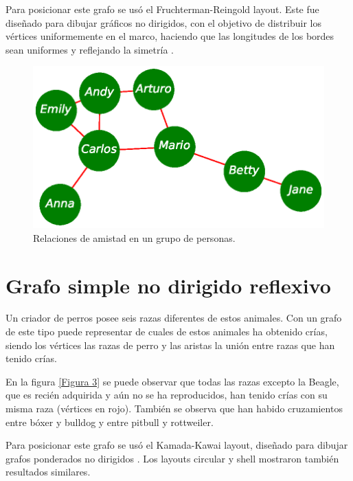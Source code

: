 \documentclass{article}
\begin{document}
Para posicionar este grafo se usó el Fruchterman-Reingold layout. Este fue diseñado para dibujar gráficos no dirigidos, con el objetivo de distribuir los vértices uniformemente en el marco, haciendo que las longitudes de los bordes sean uniformes y reflejando la simetría \cite{fruchterman1991graph}.
 
\begin{figure}
 \begin{center}
  \includegraphics[width=.6\columnwidth]{fig2.eps}
   \end{center}
  \caption{Relaciones de amistad en un grupo de personas.}
  \label{Figura 2}
\end{figure}



\section{Grafo simple no dirigido reflexivo}

Un criador de perros posee seis razas diferentes de estos animales. Con un grafo de este tipo puede representar de cuales de estos animales ha obtenido crías, siendo los vértices las razas de perro y las aristas la unión entre razas que han tenido crías.

En la figura \ref{Figura 3} se puede observar que todas las razas excepto la Beagle, que es recién adquirida y aún no se ha reproducidos, han tenido crías con su misma raza (vértices en rojo). También se observa que han habido cruzamientos entre bóxer y bulldog y entre pitbull y rottweiler.

Para posicionar este grafo se usó el Kamada-Kawai layout, diseñado para dibujar grafos ponderados no dirigidos \cite{kamada1989algorithm}. Los layouts circular y shell mostraron también resultados similares.
\end{document}
